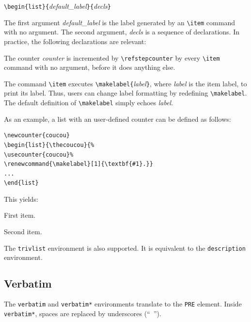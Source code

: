 \begin{flushleft}
\quad\verb+\begin{list}{+{\it default\_label}\verb+}{+{\it decls}\verb+}+
\end{flushleft}

The first argument {\it default\_label} is the label generated by an
\verb+\item+ command with no argument.
The second argument, {\it decls} is a sequence of declarations.
In practice, the following declarations are relevant:
\begin{list}{}{}
\item[\texttt{\char92 usecounter\{}\textit{counter}\texttt{\}}]
The counter {\it counter} is incremented by \verb+\refstepcounter+
by every \verb+\item+ command with no argument, before it does
anything else.
\item[\texttt{\char92 renewcommand\{\char92
makelabel\}[1]\{}\ldots\texttt{\}}]
The command \verb+\item+ executes
\verb+\makelabel{+{\it label}\verb+}+, where {\it label} is the item
label, to print its label.
Thus, users can change label formatting by redefining
\verb+\makelabel+.
The default definition of \verb+\makelabel+ simply echoes \textit{label}.
\end{list}

As an example, a list with an user-defined counter can be defined as
follows:
\begin{verbatim}
\newcounter{coucou}
\begin{list}{\thecoucou}{%
\usecounter{coucou}%
\renewcommand{\makelabel}[1]{\textbf{#1}.}}
...
\end{list}
\end{verbatim}
This yields:
\begin{list}
  {\thecoucou}
  {\renewcommand{\makelabel}[1]{\textbf{#1}.}}
\item First item.
\item Second item.
\end{list}


The \verb+trivlist+ environment is also supported. It is equivalent to
the \verb+description+ environment.

\subsection{Verbatim}

The \verb+verbatim+ and \verb+verbatim*+ environments translate to
the \verb+PRE+ element.
Inside \verb+verbatim*+, spaces are replaced by underscores (``\verb*+ +'').


